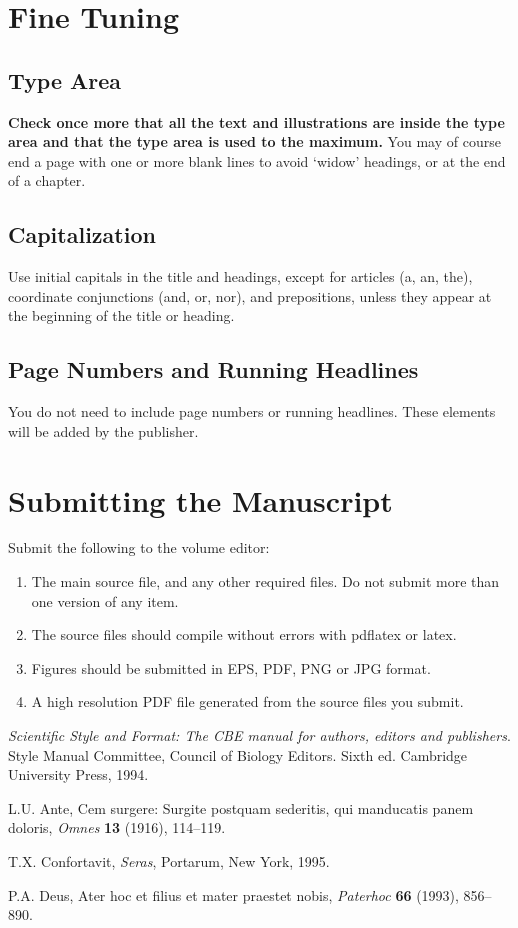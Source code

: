 \documentclass{IOS-Book-Article}
\begin{document}
\section{Fine Tuning}

\subsection{Type Area}
\textbf{Check once more that all the text and illustrations are inside the type area and
that the type area is used to the maximum.} You may of course end a page with one
or more blank lines to avoid `widow' headings, or at the end of a chapter.

\subsection{Capitalization}
Use initial capitals in the title and headings, except for articles (a, an, the), coordinate
conjunctions (and, or, nor), and prepositions, unless they appear at the beginning of the
title or heading.

\subsection{Page Numbers and Running Headlines}
You do not need to include page numbers or running headlines. These elements will be
added by the publisher.

\section{Submitting the Manuscript}
Submit the following to the volume editor:

\begin{enumerate}
\item The main source file, and any other required files. Do not submit more than
one version of any item.

\item The source files should compile without errors with pdflatex or latex.

\item Figures should be submitted in EPS, PDF, PNG or JPG format.

\item A high resolution PDF file generated from the source files you submit.
\end{enumerate}

\begin{thebibliography}{99}

\textit{Scientific Style and Format: The CBE manual for authors,
editors and publishers}. Style Manual Committee, Council of Biology Editors.
Sixth ed. Cambridge University Press, 1994.

L.U. Ante, Cem surgere: Surgite postquam sederitis, qui manducatis panem doloris,
\textit{Omnes} \textbf{13} (1916), 114--119.

T.X. Confortavit, \textit{Seras}, Portarum, New York, 1995.

P.A. Deus, Ater hoc et filius et mater praestet nobis,
\textit{Paterhoc} \textbf{66} (1993), 856--890.

\end{thebibliography}
\end{document}
